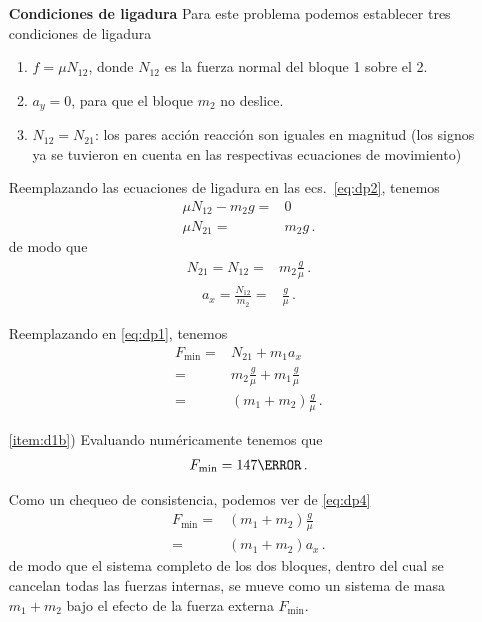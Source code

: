 \begin{enumerate}
    \textbf{Condiciones de ligadura}
    Para este problema podemos establecer tres condiciones de ligadura
    \begin{enumerate}
    \item $f=\mu N_{12}$, donde $N_{12}$ es la fuerza normal del bloque 1 sobre el 2.
    \item $a_y=0$, para que el bloque $m_2$ no deslice.
    \item $N_{12}=N_{21}$: los pares acción reacción son iguales en magnitud (los signos ya se tuvieron en cuenta en las respectivas ecuaciones de movimiento)
    \end{enumerate}

    Reemplazando las ecuaciones de ligadura en las ecs.~\eqref{eq:dp2}, tenemos
    \begin{align*}
      \mu N_{12}-m_2g=&0\nonumber\\
      \mu N_{21}=&m_2g\,.
    \end{align*}
    de modo que 
    \begin{align*}
    N_{21}=N_{12}=&m_2\frac{g}{\mu}\,.
    \end{align*}
    \begin{align*}
    a_x=\frac{N_{12}}{m_2}=&\frac{g}{\mu}\,.
    \end{align*}

    Reemplazando en \eqref{eq:dp1}, tenemos
    \begin{align}
      \label{eq:dp4}
      F_{\text{min}}=&N_{21}+m_1 a_x\nonumber\\
      =&m_2\frac{g}{\mu}+m_1 \frac{g}{\mu}\nonumber\\
      =&(m_1+m_2)\frac{g}{\mu}\,.
    \end{align}

    \item[\ref{item:d1b})] Evaluando numéricamente tenemos que
      \begin{align*}
        F_{\text{min}}=147\newton\,.
      \end{align*}

      Como un chequeo de consistencia, podemos ver de \eqref{eq:dp4}
      \begin{align*}
        F_{\text{min}}=&(m_1+m_2)\frac{g}{\mu}\nonumber\\
        =&(m_1+m_2)a_x\,.
      \end{align*}
      de modo que el sistema completo de los dos bloques, dentro del
      cual se cancelan todas las fuerzas internas, se mueve como un
      sistema de masa $m_1+m_2$ bajo el efecto de la fuerza externa
      $F_{\text{min}}$.
\end{enumerate}

\begin{extrapage}
  \newpage
  \qquad
  \newpage
\end{extrapage}

